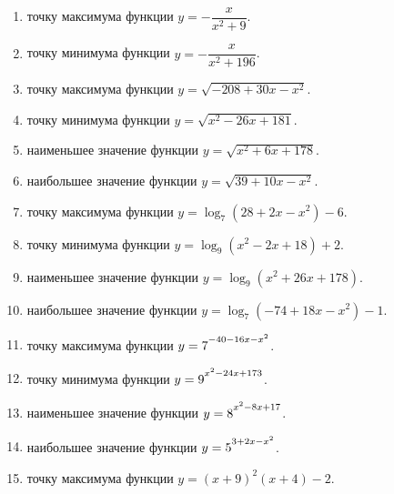 \documentclass[a4paper,10pt]{article}
\begin{document}
\begin{enumerate}
\item {} точку максимума функции $y=-\dfrac{x}{ x^2 +9}$.







\item {} точку минимума функции $y=-\dfrac{x}{ x^2 +196}$.







\item {} точку максимума функции $y=\sqrt{-208+30x-x^2}$.

\item {} точку минимума функции $y=\sqrt{x^2-26x+181}$.

\item {} наименьшее значение функции $y=\sqrt{x^2+6x+178}$.

\item {} наибольшее значение функции $y=\sqrt{39+10x-x^2}$.

\item {} точку максимума функции $y=\log_7\left(28+2x-x^2\right)-6$.

\item {} точку минимума функции $y=\log_9\left(x^2-2x+18\right)+2$.

\item {} наименьшее значение функции $y=\log_9\left(x^2+26x+178\right)$.

\item {} наибольшее значение функции $y=\log_7\left(-74+18x-x^2\right)-1$.

\item {} точку максимума функции $y=7\strut^{-40-16x-x^2}$.

\item {} точку минимума функции $y=9\strut^{x^2-24x+173}$.

\item {} наименьшее значение функции $y=8\strut^{x^2-8x+17}$.

\item {} наибольшее значение функции $y=5\strut^{3+2x-x^2}$.

\item {} точку максимума функции $y=\left(x+9\right)^2\left(x+4\right)-2$.


\end{enumerate}
\end{document}
